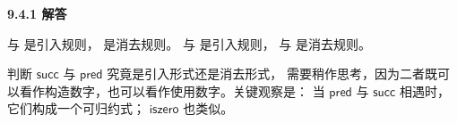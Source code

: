 \begin{taplauthorsolutionentrybox}
\label{sol:author:9.4.1}
\textbf{9.4.1 解答}

 与  是引入规则，
是消去规则。 与  是引入规则，
 与  是消去规则。

判断 \(\mathsf{succ}\) 与 \(\mathsf{pred}\) 究竟是引入形式还是消去形式，
需要稍作思考，因为二者既可以看作构造数字，也可以看作使用数字。关键观察是：
当 \(\mathsf{pred}\) 与 \(\mathsf{succ}\) 相遇时，它们构成一个可归约式；
\(\mathsf{iszero}\) 也类似。

\end{taplauthorsolutionentrybox}
